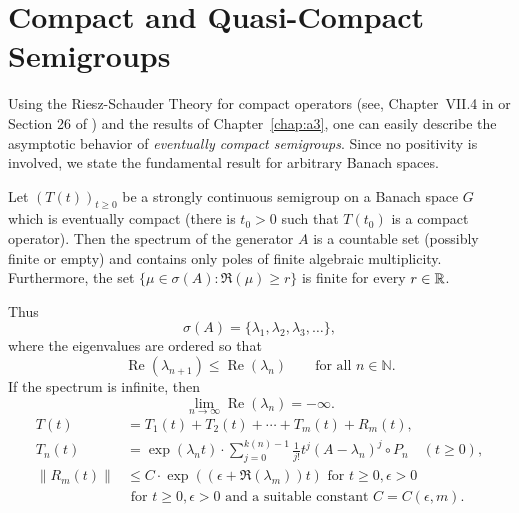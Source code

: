 \section{Compact and Quasi-Compact Semigroups}\label{sec:b4-2}
\hspace{1cm}{\Large by Günther Greiner}
\vspace{.5cm}
\newline
Using the Riesz-Schauder Theory for compact operators (see, \eg
Chapter~VII.4 in \textcite{dunfordschwartz:1958} or Section 26 of \textcite{pietsch:1978}) and the results of Chapter~\ref{chap:a3},  one can easily describe the
asymptotic behavior of \emph{eventually compact semigroups}.
Since no positivity is involved, we state the fundamental result for arbitrary Banach
spaces.
\begin{theorem}\label{thm:b4-2.1}
Let $(T(t))_{t \geq 0}$ be a strongly continuous semigroup on a Banach space $G$ which is eventually compact (\ie  there is $t_{0} > 0$ such that $T(t_{0})$ is a compact operator).
Then the spectrum of the generator $A$ is a countable set (possibly finite or empty) and contains only poles of finite algebraic multiplicity.
Furthermore, the set $\{\mu \in \sigma(A) \colon \Re(\mu) \geq r\}$ is finite for every $r \in \mathbb{R}$.

Thus
    \[
    \sigma(A)=\{\lambda_1,\lambda_2,\lambda_3,\ldots\},
    \]
    where the eigenvalues are ordered so that
    \[
    \operatorname{Re}(\lambda_{n+1})  \leq \operatorname{Re}(\lambda_n)
    \qquad \text{for all } n\in\mathbb{N}.
    \]
    If the spectrum is infinite, then
    \[
    \lim_{n\to\infty}\operatorname{Re}(\lambda_n)=-\infty .
    \]
\begin{equation}\label{eq:b4-2.1}
\begin{aligned}
	T(t) &= T_1(t) + T_2(t) + \cdots + T_m(t) + R_m(t) ,\\
	T_n(t) &= \exp(\lambda_n t) \cdot \sum_{j=0}^{k(n)-1} \frac{1}{j!}t^j(A - \lambda_n)^j \circ P_n 
		\quad (t \geq 0) ,\\
	\|R_m(t)\| & \leq C \cdot \exp((\epsilon +\Re(\lambda_m))t) \text{ for }  t \geq 0, \epsilon >0\\
			&  \text{ for }  t \geq 0, \epsilon >0  \text{ and a suitable	constant } C=C(\epsilon ,m) .
		\end{aligned}
	\end{equation}
\end{theorem}

